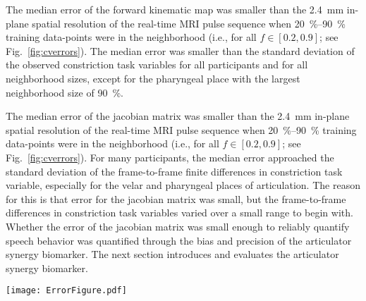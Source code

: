 \documentclass[reprint]{JASAnew}\usepackage[]{graphicx}\usepackage[]{color}
\begin{document}
The median error of the forward kinematic map was smaller than the \SI{2.4}{\milli\meter} in-plane spatial resolution of the real-time MRI pulse sequence when \SIrange{20}{90}{\percent} training data-points were in the neighborhood (i.e., for all $f\in \left[ 0.2, 0.9\right]$; see Fig.~\ref{fig:cverrors}). The median error was smaller than the standard deviation of the observed constriction task variables for all participants and for all neighborhood sizes, except for the pharyngeal place with the largest neighborhood size of \SI{90}{\percent}.


The median error of the jacobian matrix was smaller than the \SI{2.4}{\milli\meter} in-plane spatial resolution of the real-time MRI pulse sequence when \SIrange{20}{90}{\percent} training data-points were in the neighborhood (i.e., for all $f\in \left[ 0.2, 0.9\right]$; see Fig.~\ref{fig:cverrors}).
%
For many participants, the median error approached the standard deviation of the frame-to-frame finite differences in constriction task variable, especially for the velar and pharyngeal places of articulation.
%
The reason for this is that error for the jacobian matrix was small, but the frame-to-frame differences in constriction task variables varied over a small range to begin with. 
% 
Whether the error of the jacobian matrix was small enough to reliably quantify speech behavior was quantified through the bias and precision of the articulator synergy biomarker. 
% 
The next section introduces and evaluates the articulator synergy biomarker. 

\begin{figure*}
\raggedright

\texttt{[image: ErrorFigure.pdf]}

\caption{(color online) 
{\bf (a)} Median error (solid line) and 10\textsuperscript{th}-90\textsuperscript{th} percentile error range (dashed lines) of the forward kinematic map estimator of constriction task variables. {\bf (b)} Median error (solid line) and 10\textsuperscript{th}-90\textsuperscript{th} percentile error range (dashed lines) of the jacobian matrix estimator of frame-to-frame finite differences in constriction task variables. 
Data-points are the errors computed over all 10 folds of cross-validation.
Neighborhood size is given as percentage of training data-points.
The standard deviations of observed (frame-to-frame finite differences in) constriction task variables are indicated as tick marks on the right $Y$-axis for each participant whenever the standard deviations are small enough to fit within the $Y$-axis limits.}
\label{fig:cverrors}
\end{figure*}
\end{document}
